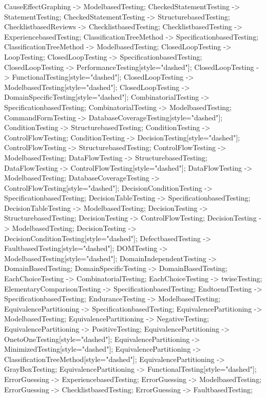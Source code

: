 \documentclass{article}
\begin{document}
{CauseEffectGraphing -> ModelbasedTesting;
CheckedStatementTesting -> StatementTesting;
CheckedStatementTesting -> StructurebasedTesting;
ChecklistbasedReviews -> ChecklistbasedTesting;
ChecklistbasedTesting -> ExperiencebasedTesting;
ClassificationTreeMethod -> SpecificationbasedTesting;
ClassificationTreeMethod -> ModelbasedTesting;
ClosedLoopTesting -> LoopTesting;
ClosedLoopTesting -> SpecificationbasedTesting;
ClosedLoopTesting -> PerformanceTesting[style="dashed"];
ClosedLoopTesting -> FunctionalTesting[style="dashed"];
ClosedLoopTesting -> ModelbasedTesting[style="dashed"];
ClosedLoopTesting -> DomainSpecificTesting[style="dashed"];
CombinatorialTesting -> SpecificationbasedTesting;
CombinatorialTesting -> ModelbasedTesting;
CommandFormTesting -> DatabaseCoverageTesting[style="dashed"];
ConditionTesting -> StructurebasedTesting;
ConditionTesting -> ControlFlowTesting;
ConditionTesting -> DecisionTesting[style="dashed"];
ControlFlowTesting -> StructurebasedTesting;
ControlFlowTesting -> ModelbasedTesting;
DataFlowTesting -> StructurebasedTesting;
DataFlowTesting -> ControlFlowTesting[style="dashed"];
DataFlowTesting -> ModelbasedTesting;
DatabaseCoverageTesting -> ControlFlowTesting[style="dashed"];
DecisionConditionTesting -> SpecificationbasedTesting;
DecisionTableTesting -> SpecificationbasedTesting;
DecisionTableTesting -> ModelbasedTesting;
DecisionTesting -> StructurebasedTesting;
DecisionTesting -> ControlFlowTesting;
DecisionTesting -> ModelbasedTesting;
DecisionTesting -> DecisionConditionTesting[style="dashed"];
DefectbasedTesting -> FaultbasedTesting[style="dashed"];
DOMTesting -> ModelbasedTesting[style="dashed"];
DomainIndependentTesting -> DomainBasedTesting;
DomainSpecificTesting -> DomainBasedTesting;
EachChoiceTesting -> CombinatorialTesting;
EachChoiceTesting -> twiseTesting;
ElementaryComparisonTesting -> SpecificationbasedTesting;
EndtoendTesting -> SpecificationbasedTesting;
EnduranceTesting -> ModelbasedTesting;
EquivalencePartitioning -> SpecificationbasedTesting;
EquivalencePartitioning -> ModelbasedTesting;
EquivalencePartitioning -> NegativeTesting;
EquivalencePartitioning -> PositiveTesting;
EquivalencePartitioning -> OnetoOneTesting[style="dashed"];
EquivalencePartitioning -> MinimizedTesting[style="dashed"];
EquivalencePartitioning -> ClassificationTreeMethod[style="dashed"];
EquivalencePartitioning -> GrayBoxTesting;
EquivalencePartitioning -> FunctionalTesting[style="dashed"];
ErrorGuessing -> ExperiencebasedTesting;
ErrorGuessing -> ModelbasedTesting;
ErrorGuessing -> ChecklistbasedTesting;
ErrorGuessing -> FaultbasedTesting;
}
\end{document}
